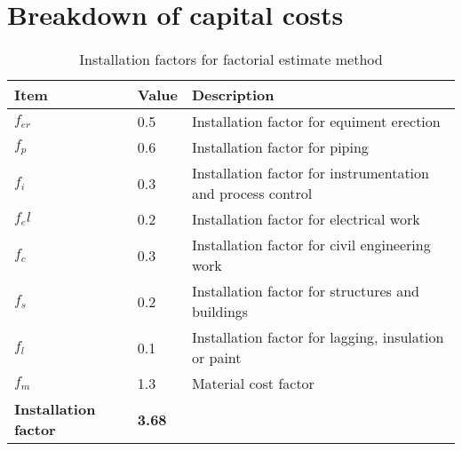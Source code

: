 \section{Breakdown of capital costs}
\begin{table}[H]
\centering
\caption{Installation factors for factorial estimate method}
\label{tab:Installation factors}
\begin{tabular}{lll}
\toprule
\textbf{Item}                & \textbf{Value} & \textbf{Description}                                        \\\midrule
$f_{er}$                       & 0.5            & Installation factor for equiment erection                   \\
$f_{p}$                        & 0.6            & Installation factor for piping                              \\
$f_{i}$                        & 0.3            & Installation factor for instrumentation and process control \\
$f_el$                       & 0.2            & Installation factor for electrical work                     \\
$f_c$                        & 0.3            & Installation factor for civil engineering work              \\
$f_s$                        & 0.2            & Installation factor for structures and buildings            \\
$f_l$                        & 0.1            & Installation factor for lagging, insulation or paint        \\
$f_m$                        & 1.3            & Material cost factor                                        \\
\textbf{Installation factor} & \textbf{3.68}  &                                                            \\\bottomrule
\end{tabular}
\end{table}